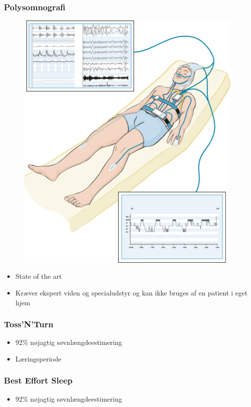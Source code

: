 \begin{frame}
\frametitle{Polysomnografi}
\begin{figure}
	\includegraphics[scale=0.05]{polysomnografi}
\end{figure}

\begin{itemize}
	\item State of the art
	\item Kræver ekspert viden og specialudstyr og kan ikke bruges af en patient i eget hjem
\end{itemize}
\end{frame}

\begin{frame}
\frametitle{Toss'N'Turn}
\begin{itemize}
	\item 92\% nøjagtig søvnlængdeestimering
	\item Læringsperiode
\end{itemize}
\end{frame}

\begin{frame}
	\frametitle{Best Effort Sleep}
	\begin{itemize}
		\item 92\% nøjagtig søvnlængdeestimering
	\end{itemize}
\end{frame}

